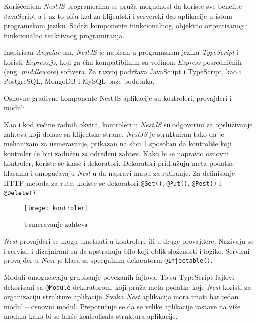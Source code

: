 Korišćenjem \textit{NestJS} programerima se pruža mogućnost da koriste sve benefite JavaScript-a i uz
to pišu kod za klijentski i serverski deo aplikacije u istom programskom jeziku. Sadrži komponente 
funkcionalnog, objektno orijentisanog i funkcionalno reaktivnog programiranja.

Inspirisan \textit{Angular}-om, \textit{NestJS} je napisan u programskom jeziku \textit{TypeScript} 
i koristi \textit{Express.js}, koji ga čini kompatibilnim sa većinom \textit{Express} posredničnih 
(eng. \textit{middleware}) softvera. Za razvoj podržava JavaScript i TypeScript, kao i PostgreSQL, 
MongoDB i MySQL baze podataka.

Osnovne gradivne komponente NestJS aplikacije su kontroleri, provajderi i moduli.

Kao i kod većine radnih okvira, kontroleri u \textit{NestJS} su odgovorini za opsluživanje zahteva koji dolaze
sa klijentske strane. \textit{NestJS} je struktuiran tako da je
mehanizam za usmeravanje, prikazan na slici \ref{fig:kontroler} sposoban da kontroliše koji kontroler 
će biti zadužen za određeni zahtev.
Kako bi se napravio osnovni kontroler, koriste se klase i dekoratori. Dekoratori pridružuju meta
podatke klasama i omogućavaju \textit{Nest}-u da napravi mapu za rutiranje. Za definisanje HTTP 
metoda za rute, koriste se dekoratori \texttt{@Get()}, \texttt{@Put()}, \texttt{@Post()} i \texttt{@Delete()}.~\cite{nest}

\begin{figure}[h]
    \centering
    \texttt{[image: kontroler]}
    \caption{Usmeravanje zahteva}
    \label{fig:kontroler}
\end{figure}
  
\textit{Nest} provajderi se mogu umetnuti u kontrolere ili u druge provajdere. Nazivaju se i servisi, 
i dizajnirani su da apstrahuju bilo koji oblik složenosti i logike.
Servisni provajder u \textit{Nest} je klasa sa specijalnim dekoratorm \texttt{@Injectable()}. 

Moduli omogućavaju grupisanje povezanih fajlova. To su TypeScript fajlovi dekorisani sa 
\texttt{@Module} dekoratorom, koji pruža meta podatke koje \textit{Nest} koristi za organizaciju 
strukture aplikacije. Svaka \textit{Nest} aplikacija mora imati bar jedan modul -- osnovni modul. 
Preporučuje se da se velike aplikacije rastave na više modula kako bi se lakše kontrolisala 
struktura aplikacije.

